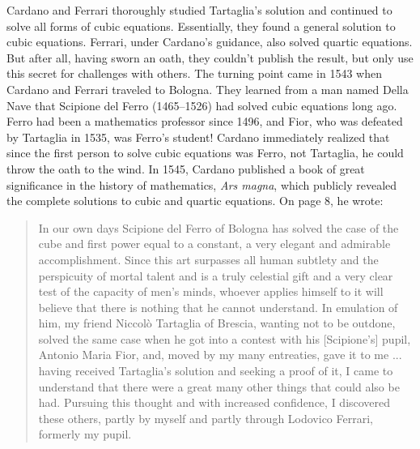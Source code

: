 \documentclass[b5paper]{article}
\begin{document}
Cardano and Ferrari thoroughly studied Tartaglia's solution and continued to solve all forms of cubic equations. Essentially, they found a general solution to cubic equations. Ferrari, under Cardano's guidance, also solved quartic equations. But after all, having sworn an oath, they couldn't publish the result, but only use this secret for challenges with others. The turning point came in 1543 when Cardano and Ferrari traveled to Bologna. They learned from a man named Della Nave that Scipione del Ferro (1465–1526) had solved cubic equations long ago. Ferro had been a mathematics professor since 1496, and Fior, who was defeated by Tartaglia in 1535, was Ferro's student! Cardano immediately realized that since the first person to solve cubic equations was Ferro, not Tartaglia, he could throw the oath to the wind. In 1545, Cardano published a book of great significance in the history of mathematics, \emph{Ars magna}, which publicly revealed the complete solutions to cubic and quartic equations. On page 8, he wrote:

\begin{quotation}
In our own days Scipione del Ferro of Bologna has solved the case of the cube and first power equal to a constant, a very elegant and admirable accomplishment. Since this art surpasses all human subtlety and the perspicuity of mortal talent and is a truly celestial gift and a very clear test of the capacity of men's minds, whoever applies himself to it will believe that there is nothing that he cannot understand. In emulation of him, my friend Niccolò Tartaglia of Brescia, wanting not to be outdone, solved the same case when he got into a contest with his [Scipione's] pupil, Antonio Maria Fior, and, moved by my many entreaties, gave it to me ... having received Tartaglia's solution and seeking a proof of it, I came to understand that there were a great many other things that could also be had. Pursuing this thought and with increased confidence, I discovered these others, partly by myself and partly through Lodovico Ferrari, formerly my pupil.
\end{quotation}
\end{document}
